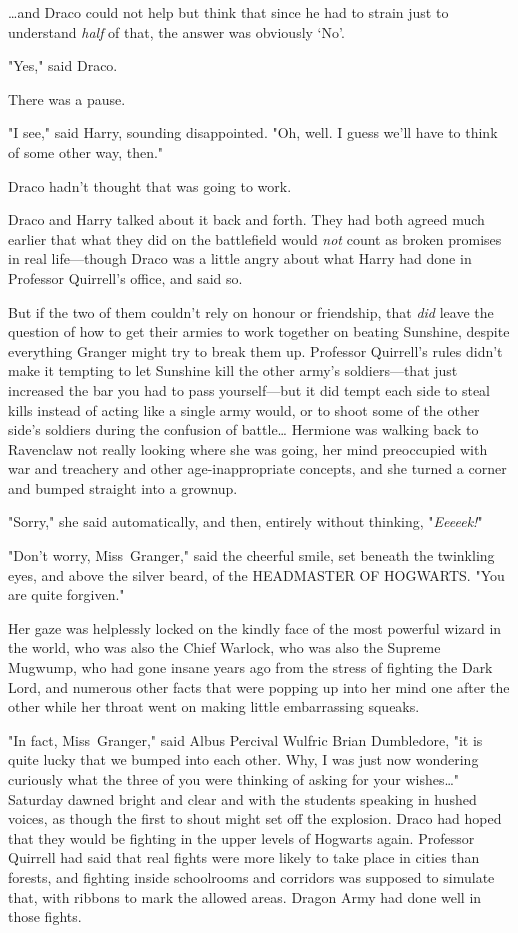 …and Draco could not help but think that since he had to strain just to
understand \emph{half} of that, the answer was obviously `No'.

"Yes," said Draco.

There was a pause.

"I see," said Harry, sounding disappointed. "Oh, well. I guess we'll have to
think of some other way, then."

Draco hadn't thought that was going to work.

Draco and Harry talked about it back and forth. They had both agreed much
earlier that what they did on the battlefield would \emph{not} count as broken
promises in real life---though Draco was a little angry about what Harry had
done in Professor Quirrell's office, and said so.

But if the two of them couldn't rely on honour or friendship, that \emph{did}
leave the question of how to get their armies to work together on beating
Sunshine, despite everything Granger might try to break them up. Professor
Quirrell's rules didn't make it tempting to let Sunshine kill the other army's
soldiers---that just increased the bar you had to pass yourself---but it did
tempt each side to steal kills instead of acting like a single army would, or
to shoot some of the other side's soldiers during the confusion of
battle…
\later
Hermione was walking back to Ravenclaw not really looking where she was going,
her mind preoccupied with war and treachery and other age-inappropriate
concepts, and she turned a corner and bumped straight into a grownup.

"Sorry," she said automatically, and then, entirely without thinking,
"\emph{Eeeeek!}"

"Don't worry, Miss~Granger," said the cheerful smile, set beneath the twinkling
eyes, and above the silver beard, of the HEADMASTER OF HOGWARTS. "You are quite
forgiven."

Her gaze was helplessly locked on the kindly face of the most powerful wizard
in the world, who was also the Chief Warlock, who was also the Supreme Mugwump,
who had gone insane years ago from the stress of fighting the Dark Lord, and
numerous other facts that were popping up into her mind one after the other
while her throat went on making little embarrassing squeaks.

"In fact, Miss~Granger," said Albus Percival Wulfric Brian Dumbledore, "it is
quite lucky that we bumped into each other. Why, I was just now wondering
curiously what the three of you were thinking of asking for your wishes…"
\later
Saturday dawned bright and clear and with the students speaking in hushed
voices, as though the first to shout might set off the explosion.
\later
Draco had hoped that they would be fighting in the upper levels of Hogwarts
again. Professor Quirrell had said that real fights were more likely to take
place in cities than forests, and fighting inside schoolrooms and corridors was
supposed to simulate that, with ribbons to mark the allowed areas. Dragon Army
had done well in those fights.

